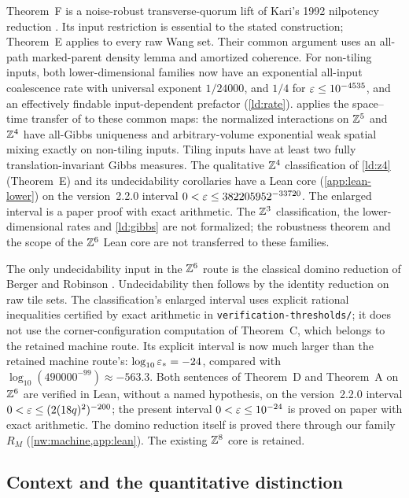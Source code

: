 Theorem~F is a noise-robust transverse-quorum lift of Kari's 1992 nilpotency reduction \cite{Kari92,Kari05}. Its input restriction is essential to the stated construction; Theorem~E applies to every raw Wang set. Their common argument uses an all-path marked-parent density lemma and amortized coherence. For non-tiling inputs, both lower-dimensional families now have an exponential all-input coalescence rate with universal exponent $1/24000$, and $1/4$ for $\varepsilon\le10^{-4535}$, and an effectively findable input-dependent prefactor (\cref{ld:rate}).  applies the space--time transfer of \cite[Corollary~13.7]{DM26} to these common maps: the normalized interactions on $\mathbb{Z}^5$ and $\mathbb{Z}^4$ have all-Gibbs uniqueness and arbitrary-volume exponential weak spatial mixing exactly on non-tiling inputs. Tiling inputs have at least two fully translation-invariant Gibbs measures. The qualitative $\mathbb{Z}^4$ classification of \cref{ld:z4} (Theorem~E) and its undecidability corollaries have a Lean core (\cref{app:lean-lower}) on the version~2.2.0 interval $0<\varepsilon\le382205952^{-33720}$. The enlarged interval is a paper proof with exact arithmetic. The $\mathbb{Z}^3$ classification, the lower-dimensional rates and \cref{ld:gibbs} are not formalized; the robustness theorem and the scope of the $\mathbb{Z}^6$ Lean core are not transferred to these families.

The only undecidability input in the $\mathbb{Z}^6$ route is the classical domino reduction of Berger and Robinson \cite{Berger66,Robinson71}. Undecidability then follows by the identity reduction on raw tile sets. The classification's enlarged interval uses explicit rational inequalities certified by exact arithmetic in \texttt{verification-\allowbreak thresholds/}; it does not use the corner-configuration computation of Theorem~C, which belongs to the retained machine route. Its explicit interval is now much larger than the retained machine route's: $\log_{10}\varepsilon_*=-24$, compared with $\log_{10}(490000^{-99})\approx-563.3$. Both sentences of Theorem~D and Theorem~A on $\mathbb{Z}^6$ are verified in Lean, without a named hypothesis, on the version~2.2.0 interval $0<\varepsilon\le(2(18q)^2)^{-200}$; the present interval $0<\varepsilon\le10^{-24}$ is proved on paper with exact arithmetic. The domino reduction itself is proved there through our family $R_M$ (\cref{nw:machine,app:lean}). The existing $\mathbb{Z}^8$ core is retained.

\subsection{Context and the quantitative distinction}

